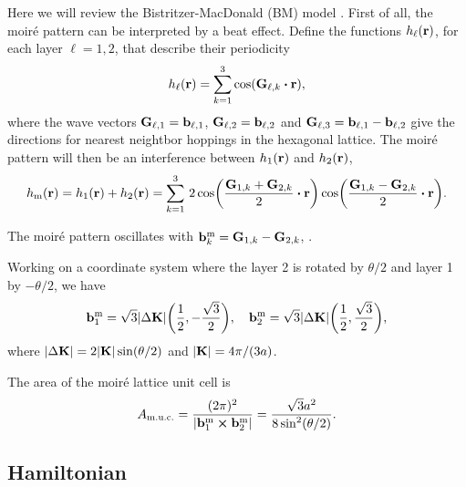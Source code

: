 Here we will review the Bistritzer-MacDonald (BM) model \cite{macdonald2011}. First of all, the moiré pattern can be interpreted by a beat effect. Define the functions $h_\ell({\vb{r}})$, for each layer $\ell = 1, 2$, that describe their periodicity
\begin{equation} \label{eq:beat-functions}
h_\ell(\r) = \sum_{k=1}^{3} \cos(\vb{G}_{\ell,k} \vdot \r),
\end{equation}
where the wave vectors $\vb{G}_{\ell,1} = \vb{b}_{\ell,1}$, $\vb{G}_{\ell,2} = \vb{b}_{\ell,2}$ and $\vb{G}_{\ell,3} = \vb{b}_{\ell,1} - \vb{b}_{\ell,2}$ give the directions for nearest neightbor hoppings in the hexagonal lattice. The moiré pattern will then be an interference between $h_1({\vb{r}})$ and $h_2({\vb{r}})$,
\begin{equation} \label{eq:beat-effect}
h_{\text{m}}(\r) = h_1(\r) + h_2(\r) =
\sum_{k=1}^{3}
\, 2 \cos(\frac{\vb{G}_{1,k}+\vb{G}_{2,k}}{2} \vdot \r) \cos(\frac{\vb{G}_{1,k}-\vb{G}_{2,k}}{2} \vdot \r).
\end{equation}

The moiré pattern oscillates with $\vb{b}_k^{\text{m}} = \vb{G}_{1,k} - \vb{G}_{2,k}$, \cite{handbook2019}.

\n

Working on a coordinate system where the layer 2 is rotated by $\theta/2$ and layer 1 by $-\theta/2$, we have
\begin{equation} \label{eq:moire-bvecs}
\vb{b}_1^{\text{m}} = \sqrt{3} \abs{\Delta {\vb{K}}} \qty( \frac{1}{2}, -\frac{\sqrt{3}}{2}), \quad
\vb{b}_2^{\text{m}} = \sqrt{3} \abs{\Delta {\vb{K}}} \qty( \frac{1}{2},  \frac{\sqrt{3}}{2}),
\end{equation}
where $\abs{\Delta {\vb{K}}} = 2 \abs{{\vb{K}}} \sin(\theta/2)$ and $\abs{{\vb{K}}} = 4\pi/(3a)$.

The area of the moiré lattice unit cell is
\begin{equation} \label{eq:moire-unitcell}
A_{\text{m.u.c.}} = \frac{(2\pi)^2}{\abs{{\vb{b}}_1^{\text{m}} \cross {\vb{b}}_2^{\text{m}}}} = \frac{\sqrt{3} a^2}{8 \sin[2](\theta/2)}.
\end{equation}

\subsection{Hamiltonian}

